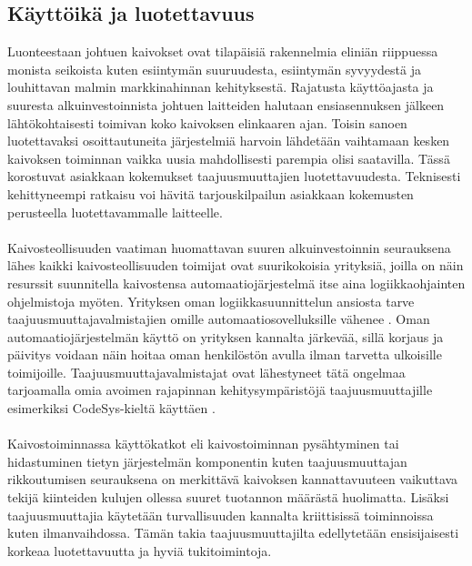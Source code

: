\documentclass[finnish,12pt,a4paper,pdftex,elec,utf8]{aaltothesis}
\begin{document}
\subsection{Käyttöikä ja luotettavuus}
Luonteestaan johtuen kaivokset ovat tilapäisiä rakennelmia eliniän riippuessa monista seikoista kuten esiintymän suuruudesta, esiintymän syvyydestä ja louhittavan malmin markkinahinnan kehityksestä. Rajatusta käyttöajasta ja suuresta alkuinvestoinnista johtuen laitteiden halutaan ensiasennuksen jälkeen lähtökohtaisesti toimivan koko kaivoksen elinkaaren ajan. Toisin sanoen luotettavaksi osoittautuneita järjestelmiä harvoin lähdetään vaihtamaan kesken kaivoksen toiminnan vaikka uusia mahdollisesti parempia olisi saatavilla. Tässä korostuvat asiakkaan kokemukset taajuusmuuttajien luotettavuudesta. Teknisesti kehittyneempi ratkaisu voi hävitä tarjouskilpailun asiakkaan kokemusten perusteella luotettavammalle laitteelle. \cite{MyyntiHaastattelu}
\\\\
Kaivosteollisuuden vaatiman huomattavan suuren alkuinvestoinnin seurauksena lähes kaikki kaivosteollisuuden toimijat ovat suurikokoisia yrityksiä, joilla on näin resurssit suunnitella kaivostensa automaatiojärjestelmä itse aina logiikkaohjainten ohjelmistoja myöten. Yrityksen oman logiikkasuunnittelun ansiosta tarve taajuusmuuttajavalmistajien omille automaatiosovelluksille vähenee \cite{MyyntiHaastattelu}. Oman automaatiojärjestelmän käyttö on yrityksen kannalta järkevää, sillä korjaus ja päivitys voidaan näin hoitaa oman henkilöstön avulla ilman tarvetta ulkoisille toimijoille. \cite{MyyntiHaastattelu} Taajuusmuuttajavalmistajat ovat lähestyneet tätä ongelmaa tarjoamalla omia avoimen rajapinnan kehitysympäristöjä taajuusmuuttajille esimerkiksi CodeSys-kieltä käyttäen \cite{880hwman}.
\\\\
Kaivostoiminnassa käyttökatkot eli kaivostoiminnan pysähtyminen tai hidastuminen tietyn järjestelmän komponentin kuten taajuusmuuttajan rikkoutumisen seurauksena on merkittävä kaivoksen kannattavuuteen vaikuttava tekijä kiinteiden kulujen ollessa suuret tuotannon määrästä huolimatta. Lisäksi taajuusmuuttajia käytetään turvallisuuden kannalta kriittisissä toiminnoissa kuten ilmanvaihdossa. Tämän takia taajuusmuuttajilta edellytetään ensisijaisesti korkeaa luotettavuutta ja hyviä tukitoimintoja.\cite{MyyntiHaastattelu}


\end{document}
